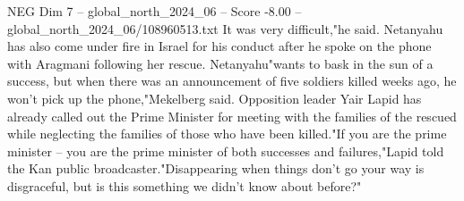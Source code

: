 \begin{textsample}{NEG Dim 7 – global\_north\_2024\_06 – Score -8.00 – global\_north\_2024\_06/108960513.txt}
It was very difficult,"he said.
Netanyahu has also come under fire in Israel for his conduct after he spoke on the phone with Aragmani following her rescue.
Netanyahu"wants to bask in the sun of a success, but when there was an announcement of five soldiers killed weeks ago, he won't pick up the phone,"Mekelberg said.
Opposition leader Yair Lapid has already called out the Prime Minister for meeting with the families of the rescued while neglecting the families of those who have been killed."If you are the prime minister -- you are the prime minister of both successes and failures,"Lapid told the Kan public broadcaster."Disappearing when things don't go your way is disgraceful, but is this something we didn't know about before?"

\end{textsample}
